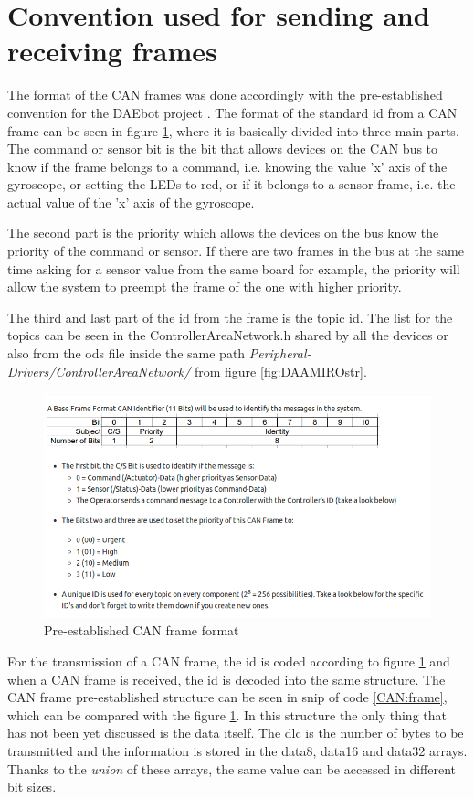 \documentclass[12pt]{report}%
\begin{document}
\section{Convention used for sending and receiving frames}
\label{sec:canconv}

The format of the CAN frames was done accordingly with the pre-established convention for the DAEbot project \cite{DAEbot_Wiki}. The format of the standard id from a CAN frame can be seen in figure \ref{fig:can}, where it is basically divided into three main parts. The command or sensor bit is the bit that allows devices on the CAN bus to know if the frame belongs to a command, i.e. knowing the value 'x' axis of the gyroscope, or setting the LEDs to red, or if it belongs to a sensor frame, i.e. the actual value of the 'x' axis of the gyroscope.

The second part is the priority which allows the devices on the bus know the priority of the command or sensor. If there are two frames in the bus at the same time asking for a sensor value from the same board for example, the priority will allow the system to preempt the frame of the one with higher priority.

The third and last part of the id from the frame is the topic id. The list for the topics can be seen in the ControllerAreaNetwork.h shared by all the devices or also from the ods file inside the same path \textit{Peripheral-Drivers/ControllerAreaNetwork/} from figure \ref{fig:DAAMIROstr}.

\begin{figure}[ht]
	\centering
	\includegraphics[width=\textwidth]{can_structure}
    \caption{Pre-established CAN frame format \cite{DAEbot_Wiki}}
    \label{fig:can}
\end{figure}

For the transmission of a CAN frame, the id is coded according to figure \ref{fig:can} and when a CAN frame is received, the id is decoded into the same structure. The CAN frame pre-established structure can be seen in snip of code \ref{CAN:frame}, which can be compared with the figure \ref{fig:can}. In this structure the only thing that has not been yet discussed is the data itself. The dlc is the number of bytes to be transmitted and the information is stored in the data8, data16 and data32 arrays. Thanks to the \textit{union} of these arrays, the same value can be accessed in different bit sizes.
\end{document}
